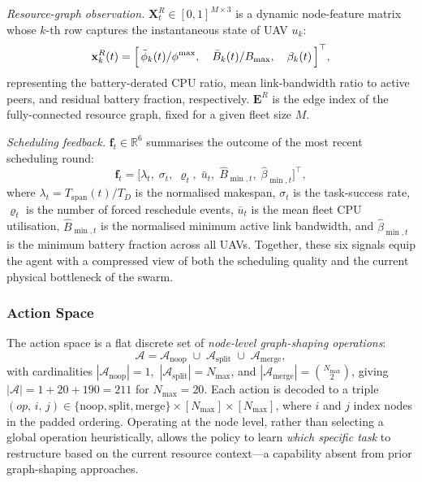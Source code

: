 \textit{Resource-graph observation.}
$\mathbf{X}^R_t \in [0,1]^{M \times 3}$ is a dynamic node-feature
matrix whose $k$-th row captures the instantaneous state of UAV $u_k$:
\begin{equation}
  \mathbf{x}_k^R(t) =
  \Bigl[\,
    \tilde{\phi}_k(t)/\phi^{\max},\quad
    \bar{B}_k(t)/B_{\max},\quad
    \beta_k(t)
  \,\Bigr]^\top,
  \label{eq:res_feat}
\end{equation}
representing the battery-derated CPU ratio,
mean link-bandwidth ratio to active peers,
and residual battery fraction, respectively.
$\mathbf{E}^R$ is the edge index of the fully-connected resource
graph, fixed for a given fleet size $M$.

\textit{Scheduling feedback.}
$\mathbf{f}_t \in \mathbb{R}^6$ summarises the outcome of the
most recent scheduling round:
\begin{equation}
  \mathbf{f}_t = \bigl[
    \lambda_t,\;\sigma_t,\;\varrho_t,\;
    \bar{u}_t,\;\hat{B}_{\min,t},\;\hat{\beta}_{\min,t}
  \bigr]^\top,
  \label{eq:feedback}
\end{equation}
where $\lambda_t = T_{\mathrm{span}}(t)/T_D$ is the normalised
makespan, $\sigma_t$ is the task-success rate, $\varrho_t$ is the
number of forced reschedule events, $\bar{u}_t$ is the mean fleet
CPU utilisation, $\hat{B}_{\min,t}$ is the normalised minimum active
link bandwidth, and $\hat{\beta}_{\min,t}$ is the minimum battery
fraction across all UAVs.
Together, these six signals equip the agent with a compressed
view of both the scheduling quality and the current physical
bottleneck of the swarm.

\subsubsection*{Action Space}

The action space is a flat discrete set of
\emph{node-level graph-shaping operations}:
\begin{equation}
  \mathcal{A} = \mathcal{A}_{\mathrm{noop}}
              \;\cup\; \mathcal{A}_{\mathrm{split}}
              \;\cup\; \mathcal{A}_{\mathrm{merge}},
  \label{eq:action_space}
\end{equation}
with cardinalities
$|\mathcal{A}_{\mathrm{noop}}| = 1$,\,
$|\mathcal{A}_{\mathrm{split}}| = N_{\max}$, and
$|\mathcal{A}_{\mathrm{merge}}| = \binom{N_{\max}}{2}$,
giving $|\mathcal{A}| = 1 + 20 + 190 = 211$ for $N_{\max} = 20$.
Each action is decoded to a triple
$(op,\, i,\, j) \in
 \{\mathrm{noop},\mathrm{split},\mathrm{merge}\}
 \times [N_{\max}] \times [N_{\max}]$,
where $i$ and $j$ index nodes in the padded ordering.
Operating at the node level, rather than selecting a global operation
heuristically, allows the policy to learn \emph{which specific task}
to restructure based on the current resource context—a capability
absent from prior graph-shaping approaches.

